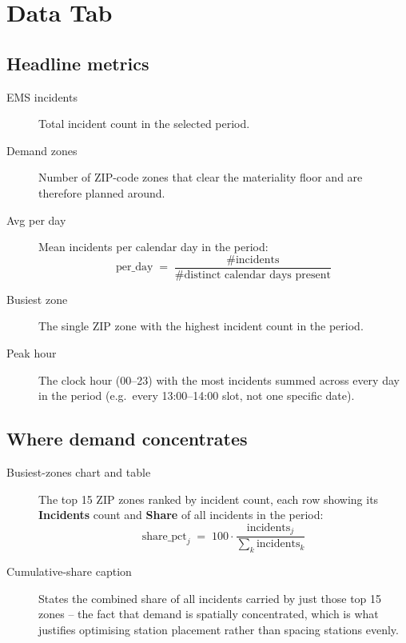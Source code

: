 \documentclass[11pt]{article}
\begin{document}
\section{Data Tab}

\subsection{Headline metrics}
\begin{description}
  \item[EMS incidents] Total incident count in the selected period.
  \item[Demand zones] Number of ZIP-code zones that clear the materiality
    floor and are therefore planned around.
  \item[Avg per day] Mean incidents per calendar day in the period:
    \[
      \text{per\_day} \;=\; \frac{\#\text{incidents}}{\#\text{distinct calendar days present}}
    \]
  \item[Busiest zone] The single ZIP zone with the highest incident count in
    the period.
  \item[Peak hour] The clock hour (00--23) with the most incidents summed
    across every day in the period (e.g.\ every 13:00--14:00 slot, not one
    specific date).
\end{description}

\subsection{Where demand concentrates}
\begin{description}
  \item[Busiest-zones chart and table] The top 15 ZIP zones ranked by incident
    count, each row showing its \textbf{Incidents} count and \textbf{Share}
    of all incidents in the period:
    \[
      \text{share\_pct}_j \;=\; 100\cdot\frac{\text{incidents}_j}{\sum_k \text{incidents}_k}
    \]
  \item[Cumulative-share caption] States the combined share of all incidents
    carried by just those top 15 zones -- the fact that demand is spatially
    concentrated, which is what justifies optimising station placement rather
    than spacing stations evenly.
\end{description}
\end{document}
